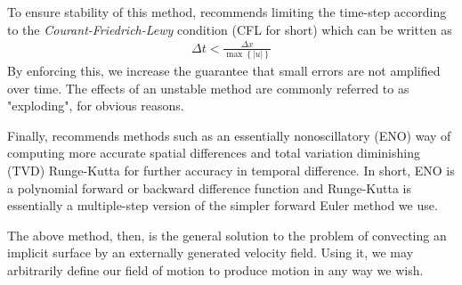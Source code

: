 To ensure stability of this method,  recommends
limiting the time-step according to the \emph{Courant-Friedrich-Lewy}
condition (CFL for short) which can be written as
\begin{eqnarray}
  \Delta t < \frac{\Delta x}{\max \left\lbrace \left| u \right| \right\rbrace}
\end{eqnarray}
By enforcing this, we increase the guarantee that small errors are not
amplified over time. The effects of an unstable method are commonly
referred to as "exploding", for obvious reasons.

Finally,  recommends methods such as an
essentially nonoscillatory (ENO) way of computing more accurate
spatial differences and total variation diminishing (TVD) Runge-Kutta
for further accuracy in temporal difference. In short, ENO is a
polynomial forward or backward difference function and Runge-Kutta is
essentially a multiple-step version of the simpler forward Euler
method we use.

The above method, then, is the general solution to the problem of
convecting an implicit surface by an externally generated velocity
field. Using it, we may arbitrarily define our field of motion to
produce motion in any way we wish.


